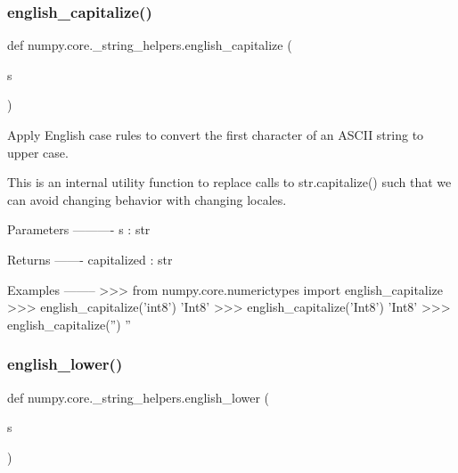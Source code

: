 \subsubsection{\texorpdfstring{english\+\_\+capitalize()}{english\_capitalize()}}
{\footnotesize\ttfamily def numpy.\+core.\+\_\+string\+\_\+helpers.\+english\+\_\+capitalize (\begin{DoxyParamCaption}\item[{}]{s }\end{DoxyParamCaption})}

\begin{DoxyVerb}Apply English case rules to convert the first character of an ASCII
string to upper case.

This is an internal utility function to replace calls to str.capitalize()
such that we can avoid changing behavior with changing locales.

Parameters
----------
s : str

Returns
-------
capitalized : str

Examples
--------
>>> from numpy.core.numerictypes import english_capitalize
>>> english_capitalize('int8')
'Int8'
>>> english_capitalize('Int8')
'Int8'
>>> english_capitalize('')
''
\end{DoxyVerb}
 \mbox{\label{namespacenumpy_1_1core_1_1__string__helpers_aaa1d620a85b4e2b18d4bb6d837e81332}} 
\subsubsection{\texorpdfstring{english\+\_\+lower()}{english\_lower()}}
{\footnotesize\ttfamily def numpy.\+core.\+\_\+string\+\_\+helpers.\+english\+\_\+lower (\begin{DoxyParamCaption}\item[{}]{s }\end{DoxyParamCaption})}


